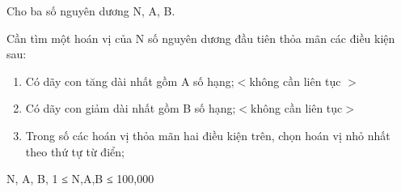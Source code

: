 Cho ba số nguyên dương N, A, B.  

   Cần tìm một hoán vị của N số nguyên dương đầu tiên thỏa mãn các điều kiện sau:  
\begin{enumerate}
	\item     Có dãy con tăng dài nhất gồm A số hạng;$<$không cần liên tục $>$   
	\item     Có dãy con giảm dài nhất gồm B số hạng;$<$không cần liên tục$>$   
	\item     Trong số các hoán vị thỏa mãn hai điều kiện trên, chọn hoán vị nhỏ nhất theo thứ tự từ điển;   
\end{enumerate}

   N, A, B, 1 ≤ N,A,B ≤ 100,000